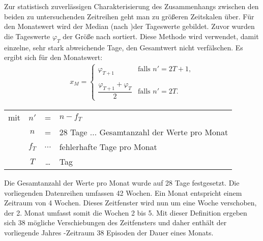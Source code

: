 \documentclass[a4paper,10pt]{scrbook}
\begin{document}
 Zur statistisch zuverlässigen Charakterisierung des Zusammenhangs zwischen den beiden zu untersuchenden Zeitreihen geht man zu größeren Zeitskalen über. Für den Monatswert wird der Median (nach \cite{TaschenbuchMathematik})der Tageswerte gebildet. Zuvor wurden die Tageswerte $\varphi_{T}$ der Größe nach sortiert.
Diese Methode wird verwendet, damit einzelne, sehr stark abweichende Tage, den Gesamtwert nicht verfälschen. Es ergibt sich für den Monatswert:
\begin{align}
x_{M} = \begin{cases} \varphi_{T+1}& \text{falls $n'=2T+1$},\\
							\nonumber\\
							 \dfrac{\varphi_{T+1}+\varphi_{T}}{2}& \text{falls $n'=2T$}. \end{cases}
\end{align}
\begin{table}[H]
\begin{tabular}{rccl}
mit  & $n'$ & = & $n - f_{T}$\\
	 & $n$ & = & 28 Tage $\ldots$ Gesamtanzahl der Werte pro Monat\\
	 & $f_{T}$ & $\ldots$ & fehlerhafte Tage pro Monat\\
	 & $T$ & \ldots & Tag\\
\end{tabular}
\end{table}
Die Gesamtanzahl der Werte pro Monat wurde auf 28 Tage festgesetzt. Die vorliegenden Datenreihen umfassen 42 Wochen. Ein Monat entspricht einem Zeitraum von 4 Wochen. Dieses Zeitfenster wird nun um eine Woche verschoben, der 2. Monat umfasst somit die Wochen 2 bis 5. Mit dieser Definition ergeben sich 38 mögliche Verschiebungen des Zeitfensters und daher enthält der vorliegende Jahres -Zeitraum 38 Episoden der Dauer eines Monats.\\ 
\end{document}
